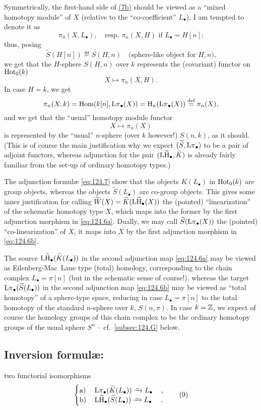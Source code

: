 Symmetrically, the first-hand side of \hyperref[eq:124.7]{(7b)} should
be viewed as a ``mixed homotopy module'' of $X$ (relative to the
``co-coefficient'' $L_\bullet$), I am tempted to denote it as
\[\pi_0(X,L_\bullet),\quad\text{resp.\ $\pi_n(X,H)$ if
  $L_\bullet=H[n]$;}\]
thus, posing
\begin{equation}
  \label{eq:124.8b}
  \widetilde S(H[n]) \eqdef S(H,n) \quad\text{(sphere-like object for
    $H,n$),}\tag{8b}
\end{equation}
we get that the $H$-sphere $S(H,n)$ over $k$ represents the
(covariant) functor on $\operatorname{Hot}_0(k)$
\[X\mapsto \pi_n(X,H).\]
In case $H=k$, we get
\[\pi_n(X,k) = \operatorname{Hom}(k[n],\operatorname{L\pi}_\bullet(X)) = \mathrm
H_n(\operatorname{L\pi}_\bullet(X)) \overset{\textup{def}}{=} \pi_n(X),\]
and we get that the ``usual'' homotopy module functor
\[X\mapsto \pi_n(X)\]
is represented by the ``usual'' $n$-sphere (over $k$ however!)
$S(n,k)$, as it should. (This is of course the main justification why
we expect $(\widetilde S,\operatorname{L\pi}_\bullet)$ to be a pair of adjoint
functors, whereas adjunction for the pair $(\operatorname{L\widetilde H}_\bullet,\widetilde
K)$ is already fairly familiar from the set-up of ordinary homotopy
types.)

The adjunction formulæ \eqref{eq:124.7} show that the objects
$K(L_\bullet)$ in $\operatorname{Hot}_0(k)$ are group objects, whereas the objects
$\widetilde S(L_\bullet)$ are co-group objects. This gives some inner
justification for calling $\widetilde W(X)=\widetilde
K(\operatorname{L\widetilde H}_\bullet(X))$ the (pointed) ``linearization'' of the
schematic homotopy type $X$, which maps into the former by the first
adjunction morphism in \eqref{eq:124.6a}. Dually, we may call
$\widetilde S(\operatorname{L\pi}_\bullet(X))$ the (pointed) ``co-linearization'' of
$X$, it maps into $X$ by the first adjunction morphism in
\eqref{eq:124.6b}.

The source $\operatorname{L\widetilde H}_\bullet(\widetilde K(L_\bullet))$ in the second
adjunction map \eqref{eq:124.6a} may be viewed as Eilenberg-Mac~Lane
type (total) homology, corresponding to the chain complex
$L_\bullet=\pi[n]$ (but in the schematic sense of course!), whereas
the target $\operatorname{L\pi}_\bullet(\widetilde S(L_\bullet))$ in the second
adjunction map \eqref{eq:124.6b} may be viewed as ``total homotopy''
of a sphere-type space, reducing in case $L_\bullet=\pi[n]$ to the
total homotopy of the standard $n$-sphere over $k$, $S(n,\pi)$. In
case $k={\mathbb{Z}}$, we expect of course the homology groups of this chain
complex to be the ordinary homotopy groups of the usual sphere $S^n$
-- cf.~\ref{subsec:124.G} below.

\subsection[Inversion formulæ]{Inversion formulæ:}
\label{subsec:124.B}%
two functorial isomorphisms
\begin{equation}
  \label{eq:124.9}
  \left\{
    \begin{tabular}{@{}lll@{}}
      a) & $\Lpi_\bullet(\widetilde K(L_\bullet)) \tosim L_\bullet$ & , \\
      b) & $\LtH_\bullet(\widetilde S(L_\bullet)) \tosim L_\bullet$ & .
    \end{tabular}
  \right.\tag{9}
\end{equation}

